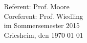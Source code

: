
\maketitle		

\thispagestyle{empty}

\begin{center}
	
	Referent: Prof. Moore \\[0.5cm]
	Coreferent: Prof. Wiedling \\[2cm]
	
	im Sommersemester 2015 \\[5mm]
	Griesheim, den \today
	
	
\end{center}


\vspace{1.4cm}


\linespread {1.25}\selectfont %



	


